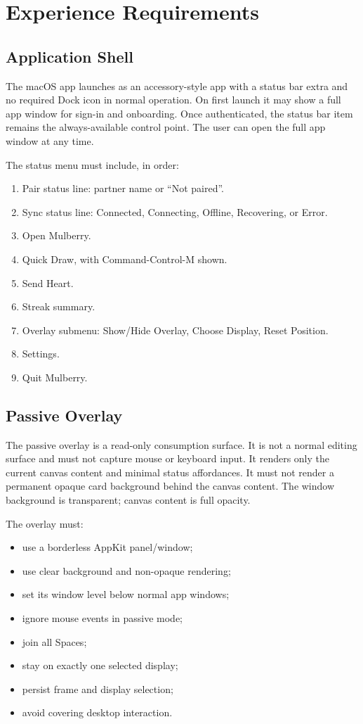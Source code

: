 \documentclass[11pt]{article}
\begin{document}
\section{Experience Requirements}

\subsection{Application Shell}

The macOS app launches as an accessory-style app with a status bar extra and no required Dock icon in normal operation. On first launch it may show a full app window for sign-in and onboarding. Once authenticated, the status bar item remains the always-available control point. The user can open the full app window at any time.

The status menu must include, in order:
\begin{enumerate}
  \item Pair status line: partner name or ``Not paired''.
  \item Sync status line: Connected, Connecting, Offline, Recovering, or Error.
  \item Open Mulberry.
  \item Quick Draw, with Command-Control-M shown.
  \item Send Heart.
  \item Streak summary.
  \item Overlay submenu: Show/Hide Overlay, Choose Display, Reset Position.
  \item Settings.
  \item Quit Mulberry.
\end{enumerate}

\subsection{Passive Overlay}

The passive overlay is a read-only consumption surface. It is not a normal editing surface and must not capture mouse or keyboard input. It renders only the current canvas content and minimal status affordances. It must not render a permanent opaque card background behind the canvas content. The window background is transparent; canvas content is full opacity.

The overlay must:
\begin{itemize}
  \item use a borderless AppKit panel/window;
  \item use clear background and non-opaque rendering;
  \item set its window level below normal app windows;
  \item ignore mouse events in passive mode;
  \item join all Spaces;
  \item stay on exactly one selected display;
  \item persist frame and display selection;
  \item avoid covering desktop interaction.
\end{itemize}
\end{document}
